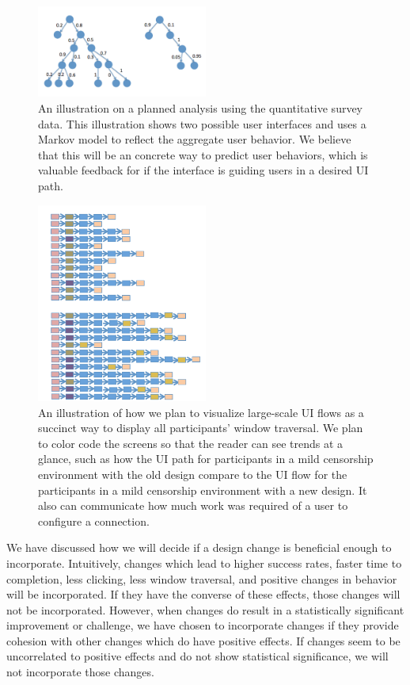\documentclass{template}
\begin{document}
\begin{figure}[t]
\label{fig:markov}
  \centering
    \includegraphics[width=0.5\textwidth]{markov.png}
    \caption{An illustration on a planned analysis using the quantitative survey data. This illustration shows two possible user interfaces and uses a Markov model to reflect the aggregate user behavior. We believe that this will be an concrete way to predict user behaviors, which is valuable feedback for if the interface is guiding users in a desired UI path.}
\end{figure}

\begin{figure}[t]
\label{fig:bar}
  \centering
    \includegraphics[width=0.5\textwidth]{screen-bar.png}
    \caption{An illustration of how we plan to visualize large-scale UI flows as a succinct way to display all participants' window traversal. We plan to color code the screens so that the reader can see trends at a glance, such as how the UI path for participants in a mild censorship environment with the old design compare to the UI flow for the participants in a mild censorship environment with a new design. It also can communicate how much work was required of a user to configure a connection.}
\end{figure}

 We have discussed how we will decide if a design change is beneficial enough to incorporate. Intuitively, changes which lead to higher success rates, faster time to completion, less clicking, less window traversal, and positive changes in behavior will be incorporated. If they have the converse of these effects, those changes will not be incorporated. However, when changes do result in a statistically significant improvement or challenge, we have chosen to incorporate changes if they provide cohesion with other changes which do have positive effects. If changes seem to be uncorrelated to positive effects and do not show statistical significance, we will not incorporate those changes. \\
\end{document}
